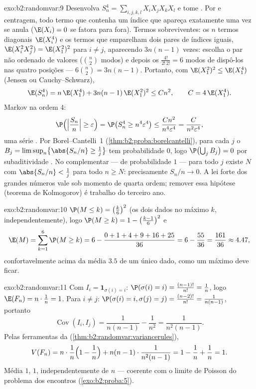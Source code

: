 \begin{solution}{exo:b2:randomvar:9}
Desenvolva $S_n^4 = \sum_{i,j,k,l}X_iX_jX_kX_l$ e tome
. Por  e centragem, todo termo que contenha
um índice que apareça exatamente uma vez se anula ($\E(X_i) = 0$ se fatora
para fora). Termos sobreviventes: os $n$ termos diagonais $\E(X_i^4)$ e os
termos que emparelham dois pares de índices iguais, $\E(X_i^2X_j^2) =
\E(X_1^2)^2$ para $i \neq j$, aparecendo $3n(n-1)$ vezes: escolha
o par não ordenado de valores ($\binom n2$ modos) e depois os
$\frac{4!}{2!\,2!} = 6$ modos de dispô-los nas quatro posições ---
$6\binom n2 = 3n(n-1)$. Portanto, com $\E(X_1^2)^2
\leq \E(X_1^4)$ (Jensen ou Cauchy--Schwarz),
\[
\E(S_n^4) = n\,\E(X_1^4) + 3n(n-1)\,\E(X_1^2)^2
\leq C n^2,
\qquad C = 4\,\E(X_1^4) .
\]
Markov na ordem 4:
\[
\P\Bigl(\Bigl|\frac{S_n}{n}\Bigr| \geq \varepsilon\Bigr)
= \P\bigl(S_n^4 \geq n^4\varepsilon^4\bigr)
\leq \frac{Cn^2}{n^4\varepsilon^4}
= \frac{C}{n^2\varepsilon^4} ,
\]
uma série . Por Borel--Cantelli~1
(\cref{thm:b2:proba:borelcantelli}), para cada $j$ o 
$B_j = \limsup_n\bigl\{\abs{S_n/n} \geq \frac1j\bigr\}$ tem
probabilidade $0$, logo $\P\bigl(\bigcup_j B_j\bigr) = 0$ por
subaditividade . No complementar --- de probabilidade $1$
--- para todo $j$ existe $N$ com $\abs{S_n/n} < \frac1j$ para
todo $n \geq N$: precisamente $S_n/n \to 0$. A lei forte dos grandes
números vale sob momento de quarta ordem; remover essa hipótese
(teorema de Kolmogorov) é trabalho do terceiro ano.
\end{solution}

\begin{solution}{exo:b2:randomvar:10}
$\P(M \leq k) = \bigl(\frac k6\bigr)^2$ (os dois dados no máximo
$k$, independentemente), logo $\P(M \geq k) = 1 -
\bigl(\frac{k-1}6\bigr)^2$ e
\[
\E(M) = \sum_{k=1}^6\P(M \geq k)
= 6 - \frac{0 + 1 + 4 + 9 + 16 + 25}{36}
= 6 - \frac{55}{36} = \frac{161}{36} \approx 4.47 ,
\]
confortavelmente acima da média $3.5$ de um único dado, como um
máximo deve ficar.
\end{solution}

\begin{solution}{exo:b2:randomvar:11}
Com $I_i = \mathbf 1_{\sigma(i) = i}$: $\P(\sigma(i) = i) =
\frac{(n-1)!}{n!} = \frac1n$, logo $\E(F_n) = n\cdot\frac1n =
1$. Para $i \neq j$: $\P(\sigma(i) = i, \sigma(j) = j) =
\frac{(n-2)!}{n!} = \frac1{n(n-1)}$, portanto
\[
\operatorname{Cov}(I_i, I_j) = \frac1{n(n-1)} - \frac1{n^2}
= \frac{1}{n^2(n-1)} .
\]
Pelas ferramentas da 
(\cref{thm:b2:randomvar:variancerules}),
\[
V(F_n) = n\cdot\frac1n\Bigl(1 - \frac1n\Bigr)
+ n(n-1)\cdot\frac1{n^2(n-1)}
= 1 - \frac1n + \frac1n = 1 .
\]
Média $1$,  $1$, independentemente de $n$ --- coerente
com o limite de Poisson do problema dos encontros
(\cref{exo:b2:proba:5}).
\end{solution}

